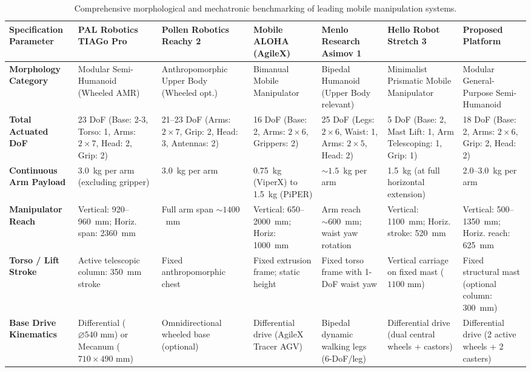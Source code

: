 \begin{table}[htbp]
\centering\scriptsize
\caption{Comprehensive morphological and mechatronic benchmarking of leading mobile manipulation systems.}
\label{tab:robot_comparison}
\begin{tabularx}{\textwidth}{@{}lYYYYYY@{}}
\toprule
\textbf{Specification Parameter} & \textbf{PAL Robotics TIAGo Pro}~\cite{tiagopro} & \textbf{Pollen Robotics Reachy 2}~\cite{reachy2} & \textbf{Mobile ALOHA (AgileX)}~\cite{mobilealoha} & \textbf{Menlo Research Asimov 1}~\cite{asimov1} & \textbf{Hello Robot Stretch 3}~\cite{stretch} & \textbf{Proposed Platform} \\
\midrule
\textbf{Morphology Category} & Modular Semi-Humanoid (Wheeled AMR) & An\-thro\-po\-mor\-phic Upper Body (Wheeled opt.) & Bimanual Mobile Manipulator & Bipedal Humanoid (Upper Body relevant) & Minimalist Prismatic Mobile Manipulator & Modular General-Purpose Semi-Humanoid \\
\addlinespace[0.2em]
\textbf{Total Actuated DoF} & 23 DoF (Base: 2-3, Torso: 1, Arms: $2 \times 7$, Head: 2, Grip: 2) & 21--23 DoF (Arms: $2 \times 7$, Grip: 2, Head: 3, Antennas: 2) & 16 DoF (Base: 2, Arms: $2 \times 6$, Grippers: 2) & 25 DoF (Legs: $2 \times 6$, Waist: 1, Arms: $2 \times 5$, Head: 2) & 5 DoF (Base: 2, Mast Lift: 1, Arm Telescoping: 1, Grip: 1) & 18 DoF (Base: 2, Arms: $2 \times 6$, Grip: 2, Head: 2) \\
\addlinespace[0.2em]
\textbf{Continuous Arm Payload} & 3.0~kg per arm (excluding gripper) & 3.0~kg per arm & 0.75~kg (ViperX) to 1.5~kg (PiPER) & $\sim 1.5$~kg per arm & 1.5~kg (at full horizontal extension) & 2.0--3.0~kg per arm \\
\addlinespace[0.2em]
\textbf{Manipulator Reach} & Vertical: 920--960~mm; Horiz. span: 2360~mm & Full arm span $\sim 1400$~mm & Vertical: 650--2000~mm; Horiz: 1000~mm & Arm reach $\sim 600$~mm; waist yaw rotation & Vertical: 1100~mm; Horiz. stroke: 520~mm & Vertical: 500--1350~mm; Horiz. reach: 625~mm \\
\addlinespace[0.2em]
\textbf{Torso / Lift Stroke} & Active telescopic column: 350~mm stroke & Fixed an\-thro\-po\-mor\-phic chest & Fixed extrusion frame; static height & Fixed torso frame with 1-DoF waist yaw & Vertical carriage on fixed mast ($1100\text{ mm}$) & Fixed structural mast (optional column: 300~mm) \\
\addlinespace[0.2em]
\textbf{Base Drive Kinematics} & Differential ($\varnothing 540\text{ mm}$) or Mecanum ($710 \times 490\text{ mm}$) & Om\-ni\-di\-rec\-tion\-al wheeled base (optional) & Differential drive (AgileX Tracer AGV) & Bipedal dynamic walking legs (6-DoF/leg) & Differential drive (dual central wheels + castors) & Differential drive (2 active wheels + 2 casters) \\

\end{tabularx}
\end{table}
